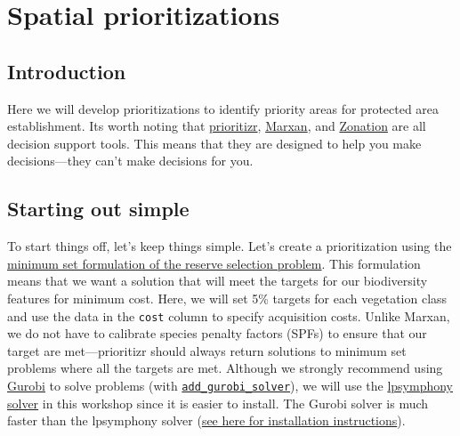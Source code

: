 \documentclass[
  12pt,
]{book}
\begin{document}
\hypertarget{spatial-prioritizations}{%
\chapter{Spatial prioritizations}\label{spatial-prioritizations}}

\hypertarget{introduction-2}{%
\section{Introduction}\label{introduction-2}}

Here we will develop prioritizations to identify priority areas for protected area establishment. Its worth noting that \href{https://prioritizr.net/}{prioritizr}, \href{http://marxan.org/}{Marxan}, and \href{https://www.helsinki.fi/en/researchgroups/digital-geography-lab/software-developed-in-cbig\#section-52992}{Zonation} are all decision support tools. This means that they are designed to help you make decisions---they can't make decisions for you.

\hypertarget{starting-out-simple}{%
\section{Starting out simple}\label{starting-out-simple}}

To start things off, let's keep things simple. Let's create a prioritization using the \href{https://prioritizr.net/reference/add_min_set_objective.html}{minimum set formulation of the reserve selection problem}. This formulation means that we want a solution that will meet the targets for our biodiversity features for minimum cost. Here, we will set 5\% targets for each vegetation class and use the data in the \texttt{cost} column to specify acquisition costs. Unlike Marxan, we do not have to calibrate species penalty factors (SPFs) to ensure that our target are met---prioritizr should always return solutions to minimum set problems where all the targets are met. Although we strongly recommend using \href{https://www.gurobi.com/}{Gurobi} to solve problems (with \href{https://prioritizr.net/reference/add_gurobi_solver.html}{\texttt{add\_gurobi\_solver}}), we will use the \href{https://prioritizr.net/reference/add_lsymphony_solver.html}{lpsymphony solver} in this workshop since it is easier to install. The Gurobi solver is much faster than the lpsymphony solver (\href{https://prioritizr.net/articles/gurobi_installation.html}{see here for installation instructions}).
\end{document}

